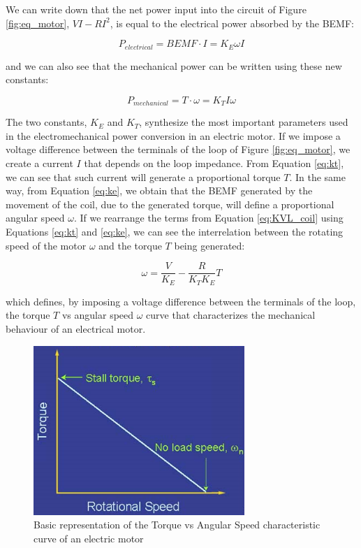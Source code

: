 We can write down that the net power input into the circuit of Figure \ref{fig:eq_motor}, $VI-RI^{2}$, is equal to the electrical power absorbed by the \ac{BEMF}:

\begin{equation}
	\label{eq:p_elec_2}
	P_{electrical} = BEMF \cdot I = K_{E} \omega I
\end{equation}

and we can also see that the mechanical power can be written using these new constants:

\begin{equation}
	\label{eq:p_mech_2}
	P_{mechanical} = T \cdot \omega = K_{T} I \omega
\end{equation}

The two constants, $K_{E}$ and $K_{T}$, synthesize the most important parameters used in the electromechanical power conversion in an electric motor. If we impose a voltage difference between the terminals of the loop of Figure \ref{fig:eq_motor}, we create a current $I$ that depends on the loop impedance. From Equation \ref{eq:kt}, we can see that such current will generate a proportional torque $T$. In the same way, from Equation \ref{eq:ke}, we obtain that the \ac{BEMF} generated by the movement of the coil, due to the generated torque, will define a proportional angular speed $\omega$. If we rearrange the terms from Equation \ref{eq:KVL_coil} using Equations \ref{eq:kt} and \ref{eq:ke}, we can see the interrelation between the rotating speed of the motor $\omega$ and the torque $T$ being generated:

\begin{equation}
	\label{eq:speed_1}
	\omega = \frac{V}{K_{E}} - \frac{R}{K_{T}K_{E}}T
\end{equation}

which defines, by imposing a voltage difference between the terminals of the loop, the torque $T$ vs angular speed $\omega$ curve that characterizes the mechanical behaviour of an electrical motor.

\begin{figure}[htbp]
\centering
\includegraphics[width=8cm]{Images/torque_speed.png} 
\caption[Torque-Speed Curve]{Basic representation of the Torque vs Angular Speed characteristic curve of an electric motor}
\label{fig:torque_speed}
\end{figure}


